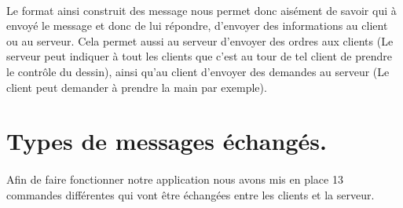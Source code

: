 \documentclass[a4paper,10pt]{article}
\begin{document}
\paragraph{}Le format ainsi construit des message nous permet donc aisément de savoir qui à envoyé le message et donc de lui répondre, d'envoyer des informations au client ou au serveur. Cela permet aussi au serveur d'envoyer des ordres aux clients (Le serveur peut indiquer à tout les clients que c'est au tour de tel client de prendre le contrôle du dessin), ainsi qu'au client d'envoyer des demandes au serveur (Le client peut demander à prendre la main par exemple).

\section{Types de messages échangés.}
\paragraph{}Afin de faire fonctionner notre application nous avons mis en place 13 commandes différentes qui vont être échangées entre les clients et la serveur.
\end{document}
